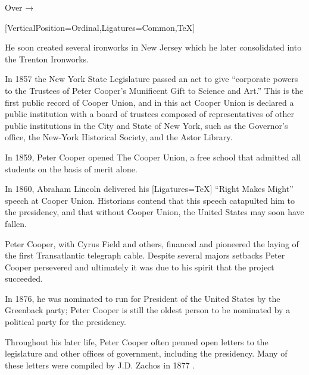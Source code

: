 \documentclass{article}
\begin{document}
\hfill Over { →}
%
\newpage{}
%
\begin{minipage}[t]{0.46\linewidth}
[VerticalPosition=Ordinal,Ligatures={Common,TeX}]
\fontsize{11pt}{13pt}\selectfont
\raggedright
\upshape
\begin{enumList}
\setcounter{enumListi}{\value{enumTemp}}

\item He soon created several ironworks in New Jersey which he later
consolidated into the { Trenton Ironworks}.

\item In 1857 the New York State Legislature passed an act to give ``corporate
powers to the Trustees of Peter Cooper's Munificent Gift to Science and Art.''
This is the first public record of Cooper Union, and in this act Cooper Union is
declared a { public institution with a board of
trustees composed of representatives of other public institutions in the City and
State of New York}, such as the Governor's office, the New-York Historical
Society, and the Astor Library.

\item In 1859, Peter Cooper opened The Cooper Union, a {
free school that admitted all students on the basis of merit alone.}
\item In 1860, { Abraham Lincoln} delivered his
{[Ligatures=TeX] ``Right Makes Might''} speech at Cooper
Union.
Historians contend that this speech catapulted him to the presidency, and that
{ without Cooper Union, the United States may soon have
fallen.}

\item Peter Cooper, with Cyrus Field and others, financed and
pioneered the laying of the { first Transatlantic
telegraph cable}. Despite several majors setbacks Peter Cooper persevered and
ultimately it was due to his spirit that the project succeeded.

\item In 1876, he was { nominated to run for President of
the United States} by the Greenback party; Peter Cooper is still the
{ oldest person} to be nominated by a political party for
the presidency.

\item Throughout his later life, Peter Cooper often penned open letters to the
legislature and other offices of government, including the presidency. Many of
these letters were compiled by J.D. Zachos in 1877 \cite{opinions}.


\end{enumList}
\end{minipage}
\end{document}
